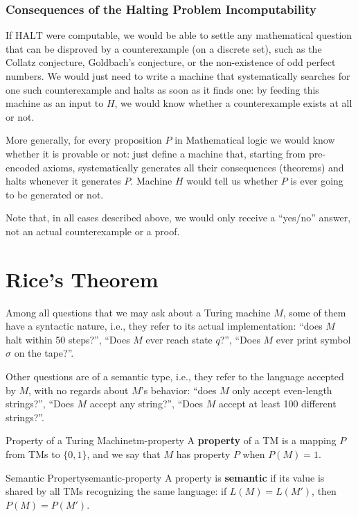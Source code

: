 \subsubsection*{Consequences of the Halting Problem Incomputability}
If \(\text{HALT}\) were computable, we would be able to settle any mathematical question that can be disproved by a counterexample (on a discrete set), such as the Collatz conjecture, Goldbach's conjecture, or the non-existence of odd perfect numbers. We would just need to write a machine that systematically searches for one such counterexample and halts as soon as it finds one: by feeding this machine as an input to \(H\), we would know whether a counterexample exists at all or not.

More generally, for every proposition \(P\) in Mathematical logic we would know whether it is provable or not: just define a machine that, starting from pre-encoded axioms, systematically generates all their consequences (theorems) and halts whenever it generates \(P\). Machine \(H\) would tell us whether \(P\) is ever going to be generated or not.

Note that, in all cases described above, we would only receive a ``yes/no'' answer, not an actual counterexample or a proof.

\section{Rice's Theorem}
Among all questions that we may ask about a Turing machine \(M\), some of them have a syntactic nature, i.e., they refer to its actual implementation: ``does \(M\) halt within 50 steps?'', ``Does \(M\) ever reach state \(q\)?'', ``Does \(M\) ever print symbol \(\sigma\) on the tape?''.

Other questions are of a semantic type, i.e., they refer to the language accepted by \(M\), with no regards about \(M\)'s behavior: ``does \(M\) only accept even-length strings?'', ``Does \(M\) accept any string?'', ``Does \(M\) accept at least 100 different strings?''.

\begin{definition}{Property of a Turing Machine}{tm-property}
    A \textbf{property} of a TM is a mapping \(P\) from TMs to \(\{0, 1\}\), and we say that \(M\) has property \(P\) when \(P(M) = 1\).
\end{definition}

\begin{definition}{Semantic Property}{semantic-property}
    A property is \textbf{semantic} if its value is shared by all TMs recognizing the same language: if \(L(M) = L(M')\), then \(P(M) = P(M')\).
\end{definition}

